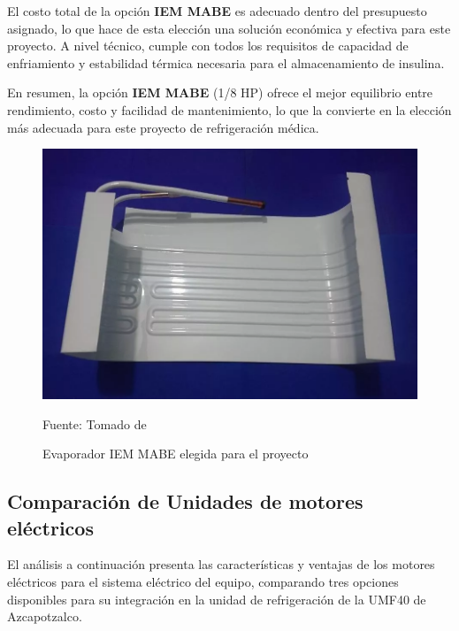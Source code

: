  El costo total de la opción \textbf{IEM MABE} es adecuado dentro del presupuesto asignado, lo que hace de esta elección una solución económica y efectiva para este proyecto. A nivel técnico, cumple con todos los requisitos de capacidad de enfriamiento y estabilidad térmica necesaria para el almacenamiento de insulina.
 
 En resumen, la opción \textbf{IEM MABE} (1/8 HP) ofrece el mejor equilibrio entre rendimiento, costo y facilidad de mantenimiento, lo que la convierte en la elección más adecuada para este proyecto de refrigeración médica.
 
 
 \begin{figure}[H]
 	\centering
 	\includegraphics[width=0.6\linewidth]{figures/evaporador}
	\caption{Evaporador IEM MABE elegida para el proyecto}
	Fuente: Tomado de \cite{mabe2024}
 	\label{fig:evaporador}
 \end{figure}
 
  
 \subsection{Comparación de Unidades de motores eléctricos}
 
El análisis a continuación presenta las características y ventajas de los motores eléctricos para el sistema eléctrico del equipo, comparando tres opciones disponibles para su integración en la unidad de refrigeración de la UMF40 de Azcapotzalco.


